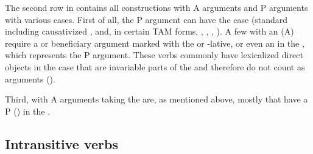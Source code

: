The second row in  contains all constructions with  A arguments and P arguments with various cases. First of all, the P argument can have the  case (standard  including causativized , and, in certain TAM forms, , , , ). A few  with an   (A) require a  or beneficiary argument marked with the  or -lative, or even an  in the  , which represents the P argument. These verbs commonly have lexicalized direct objects in the  case that are invariable parts of the  and therefore do not count as arguments ().

Third,  with A arguments taking the  are, as mentioned above, mostly  that have a P () in the . 



\subsection{Intransitive verbs}
\label{sec:Intransitive verbs}

